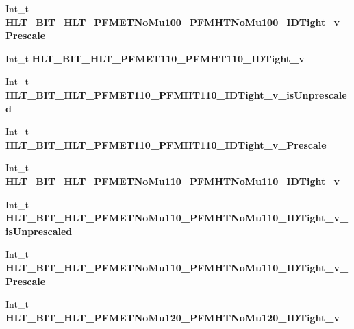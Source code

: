 \begin{DoxyCompactItemize}
\hypertarget{classMiniTree_ab0d4f705b5f6a12d0a8370c664217299}{}\label{classMiniTree_ab0d4f705b5f6a12d0a8370c664217299} 
Int\+\_\+t {\bfseries H\+L\+T\+\_\+\+B\+I\+T\+\_\+\+H\+L\+T\+\_\+\+P\+F\+M\+E\+T\+No\+Mu100\+\_\+\+P\+F\+M\+H\+T\+No\+Mu100\+\_\+\+I\+D\+Tight\+\_\+v\+\_\+\+Prescale}
\item 
\hypertarget{classMiniTree_adb141c46cb856576957b288e43a9072e}{}\label{classMiniTree_adb141c46cb856576957b288e43a9072e} 
Int\+\_\+t {\bfseries H\+L\+T\+\_\+\+B\+I\+T\+\_\+\+H\+L\+T\+\_\+\+P\+F\+M\+E\+T110\+\_\+\+P\+F\+M\+H\+T110\+\_\+\+I\+D\+Tight\+\_\+v}
\item 
\hypertarget{classMiniTree_aff2a81bafbd9541f0c1527890553b85c}{}\label{classMiniTree_aff2a81bafbd9541f0c1527890553b85c} 
Int\+\_\+t {\bfseries H\+L\+T\+\_\+\+B\+I\+T\+\_\+\+H\+L\+T\+\_\+\+P\+F\+M\+E\+T110\+\_\+\+P\+F\+M\+H\+T110\+\_\+\+I\+D\+Tight\+\_\+v\+\_\+is\+Unprescaled}
\item 
\hypertarget{classMiniTree_a081a8d7d0482626a24f794d137b664c1}{}\label{classMiniTree_a081a8d7d0482626a24f794d137b664c1} 
Int\+\_\+t {\bfseries H\+L\+T\+\_\+\+B\+I\+T\+\_\+\+H\+L\+T\+\_\+\+P\+F\+M\+E\+T110\+\_\+\+P\+F\+M\+H\+T110\+\_\+\+I\+D\+Tight\+\_\+v\+\_\+\+Prescale}
\item 
\hypertarget{classMiniTree_ac998dd1fe61ee4de2eeafb30e1472b9f}{}\label{classMiniTree_ac998dd1fe61ee4de2eeafb30e1472b9f} 
Int\+\_\+t {\bfseries H\+L\+T\+\_\+\+B\+I\+T\+\_\+\+H\+L\+T\+\_\+\+P\+F\+M\+E\+T\+No\+Mu110\+\_\+\+P\+F\+M\+H\+T\+No\+Mu110\+\_\+\+I\+D\+Tight\+\_\+v}
\item 
\hypertarget{classMiniTree_a19abf39c6227ea3496731137a0feeaff}{}\label{classMiniTree_a19abf39c6227ea3496731137a0feeaff} 
Int\+\_\+t {\bfseries H\+L\+T\+\_\+\+B\+I\+T\+\_\+\+H\+L\+T\+\_\+\+P\+F\+M\+E\+T\+No\+Mu110\+\_\+\+P\+F\+M\+H\+T\+No\+Mu110\+\_\+\+I\+D\+Tight\+\_\+v\+\_\+is\+Unprescaled}
\item 
\hypertarget{classMiniTree_a83c1809d43dfeeb48977a1aa3b856783}{}\label{classMiniTree_a83c1809d43dfeeb48977a1aa3b856783} 
Int\+\_\+t {\bfseries H\+L\+T\+\_\+\+B\+I\+T\+\_\+\+H\+L\+T\+\_\+\+P\+F\+M\+E\+T\+No\+Mu110\+\_\+\+P\+F\+M\+H\+T\+No\+Mu110\+\_\+\+I\+D\+Tight\+\_\+v\+\_\+\+Prescale}
\item 
\hypertarget{classMiniTree_ae2b6b565b37cd594fd6a8fe94a1a7321}{}\label{classMiniTree_ae2b6b565b37cd594fd6a8fe94a1a7321} 
Int\+\_\+t {\bfseries H\+L\+T\+\_\+\+B\+I\+T\+\_\+\+H\+L\+T\+\_\+\+P\+F\+M\+E\+T\+No\+Mu120\+\_\+\+P\+F\+M\+H\+T\+No\+Mu120\+\_\+\+I\+D\+Tight\+\_\+v}
\item 
\hypertarget{classMiniTree_a398458f845968b1b1104fac15bc3bc37}{}\label{classMiniTree_a398458f845968b1b1104fac15bc3bc37} 

\end{DoxyCompactItemize}
